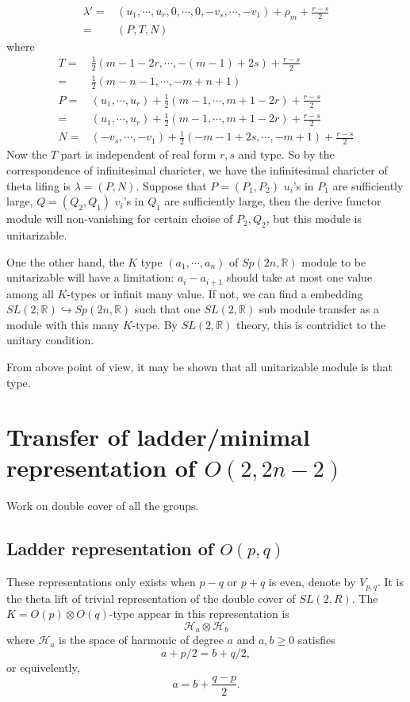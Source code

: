 \documentclass[12pt]{article}
\def\bR{{\mathbb{R}}}
\def\chh{\mathcal{H}}
\begin{document}
\[
\begin{split}
\lambda' =& (u_1, \cdots, u_r, 0,\cdots ,0, - v_s, \cdots, -v_1) + \rho_m + 
\frac{r-s}{2}
\\
=& (P, T, N)
\end{split}
\]
where
\begin{align*}
T = & \frac{1}{2}(m-1-2r, \cdots, -(m-1)+2s) + \frac{r-s}{2}\\
  = & \frac{1}{2}(m-n-1, \cdots, -m+n +1)\\ 
P = & (u_1, \cdots, u_r) + \frac{1}{2}(m-1, \cdots, m+1 -2r) + \frac{r-s}{2}\\
= & (u_1, \cdots, u_r) + \frac{1}{2}(m-1, \cdots, m+1 -2r) + \frac{r-s}{2}\\
N =& (-v_s, \cdots, -v_1) + \frac{1}{2}(-m-1 + 2s, \cdots, -m+1) + \frac{r-s}{2}
\end{align*}
Now the $T$ part is independent of real form $r,s$ and type. 
So by the correspondence of infinitesimal charicter, 
we have the infinitesimal charicter of theta lifing is 
$\lambda = (P,N)$.
Suppose that $P = (P_1, P_2)$ $u_i$'s in $P_1$ are sufficiently large, 
$Q = (Q_2,Q_1)$ $v_i$'s in $Q_1$ are sufficiently large, 
then the derive functor module will non-vanishing for certain choise 
of $P_2, Q_2$, but this module is unitarizable. 

One the other hand, the $K$ type $(a_1,\cdots, a_n)$ of 
$Sp(2n,\bR)$ module to be unitarizable 
 will have a limitation: $a_i -a_{i+1}$ should take at most one value among 
all $K$-types or infinit many value. 
If not, we can find a embedding $SL(2,\bR) \hookrightarrow Sp(2n,\bR)$
such that one $SL(2,\bR)$ sub module transfer as a module 
with this many $K$-type. By $SL(2,\bR)$ theory, this is contridict to 
the unitary condition.

From above point of view, it may be shown
that all unitarizable module is that type. 

\section{Transfer of ladder/minimal representation of $O(2,2n-2)$}
Work on double cover of all the groups. 
\subsection{Ladder representation of $O(p,q)$}
These representations only exists when $p-q$ or $p+q$ is even, denote by 
$V_{p,q}$.
It is the theta lift of trivial representation of the double cover of $SL(2,R)$.
The $K=O(p)\otimes O(q)$-type appear in this representation is 
\[
\chh_a\otimes \chh_b
\]
where $\chh_a$ is the space of harmonic of degree $a$ and $a,b \geq 0$
satisfies
\[
a+p/2 = b+q/2,
\]
or equivelently, 
\[
a = b + \frac{q-p}{2}.
\]
\end{document}
